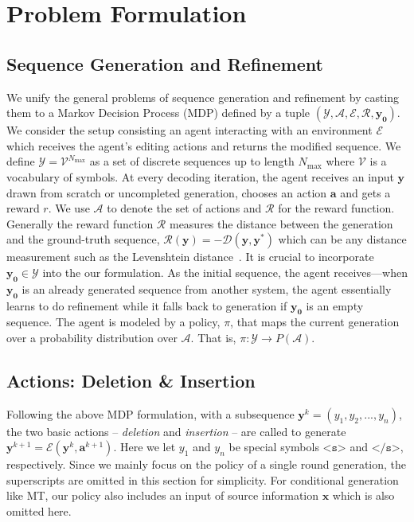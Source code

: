 \documentclass{article}
\begin{document}
\section{Problem Formulation}
\label{sec:formulation}
\subsection{Sequence Generation and Refinement}
We unify the general problems of sequence generation and refinement by casting them to a Markov Decision Process (MDP) defined by a tuple $\left(\mathcal{Y}, \mathcal{A}, \mathcal{E}, \mathcal{R}, \bm{y_0}\right)$.
We consider the setup consisting an agent interacting with an environment $\mathcal{E}$ which receives the agent's editing actions and returns the modified sequence. We define $\mathcal{Y} = \mathcal{V}^{N_{\max}}$ as a set of discrete sequences up to length $N_{\max}$ where $\mathcal{V}$ is a vocabulary of symbols. 
At every decoding iteration, the agent receives an input $\bm{y}$ drawn from scratch or uncompleted generation, chooses an action $\bm{a}$ and gets a reward $r$. We use $\mathcal{A}$ to denote the set of actions and $\mathcal{R}$ for the reward function. 
Generally the reward function $\mathcal{R}$ measures the distance between the generation and the ground-truth sequence, $\mathcal{R}(\bm{y}) = -\mathcal{D}(\bm{y}, \bm{y}^*)$ which can be any distance measurement such as the Levenshtein distance~\citep{levenshtein1965binary}.
It is crucial to incorporate $\bm{y_0} \in \mathcal{Y}$ into the our formulation. As the initial sequence, the agent receives---when $\bm{y_0}$ is an already generated sequence from another system, the agent essentially learns to do refinement while it falls back to generation if $\bm{y_0}$ is an empty sequence.
The agent is modeled by a policy, $\pi$, that maps the current generation over a probability distribution over $\mathcal{A}$. That is,  $\pi : \mathcal{Y} \to P(\mathcal{A})$. 










\subsection{Actions: Deletion \& Insertion}
Following the above MDP formulation, with a subsequence $\bm{y}^k=(y_1, y_2, ..., y_n)$, the two basic actions -- \textit{deletion} and \textit{insertion} -- are called to generate $\bm{y}^{k+1} = \mathcal{E}(\bm{y}^k, \bm{a}^{k+1})$.
Here we let $y_1$ and $y_n$  be special symbols $\texttt{<s>}$ and $\texttt{</s>}$, respectively.
Since we mainly focus on the policy of a single round generation, the superscripts are omitted in this section for simplicity. 
For conditional generation like MT, our policy also includes an input of source information $\bm{x}$ which is also omitted here.
\end{document}
